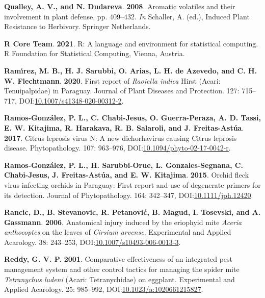 \documentclass[12pt,final,CPage]{ufthesis}
\newlength{\cslhangindent}
\newenvironment{CSLReferences}[2] %
{%
	\setlength{\parindent}{0pt}
	\ifodd #1 \everypar{\setlength{\hangindent}{\cslhangindent}}\ignorespaces\fi
	\ifnum #2 > 0
	\setlength{\parskip}{#2\baselineskip}
	\fi
}%
{}
\begin{document}
{\begin{CSLReferences}{1}{0}
  \leavevmode{}%
  \textbf{Qualley, A. V., and N. Dudareva}. \textbf{2008}. Aromatic volatiles and their involvement in plant defense, pp. 409--432. \emph{In} Schaller, A. (ed.), Induced Plant Resistance to Herbivory. Springer Netherlands.

  \leavevmode{}%
  \textbf{R Core Team}. \textbf{2021}. R: A language and environment for statistical computing. R Foundation for Statistical Computing, Vienna, Austria.

  \leavevmode{}%
  \textbf{Ramı́rez, M. B., H. J. Sarubbi, O. Arias, L. H. de Azevedo, and C. H. W. Flechtmann}. \textbf{2020}. First report of {\emph{Raoiella indica}} {Hirst} ({Acari}: {Tenuipalpidae}) in {Paraguay}. Journal of Plant Diseases and Protection. 127: 715--717, DOI:\href{https://doi.org/10.1007/s41348-020-00312-2}{10.1007/s41348-020-00312-2}.

  \leavevmode{}%
  \textbf{Ramos-González, P. L., C. Chabi-Jesus, O. Guerra-Peraza, A. D. Tassi, E. W. Kitajima, R. Harakava, R. B. Salaroli, and J. Freitas-Astúa}. \textbf{2017}. {Citrus leprosis virus} {N}: A new dichorhavirus causing {Citrus leprosis} disease. Phytopathology{\textregistered}. 107: 963--976, DOI:\href{https://doi.org/10.1094/phyto-02-17-0042-r}{10.1094/phyto-02-17-0042-r}.

  \leavevmode{}%
  \textbf{Ramos-González, P. L., H. Sarubbi-Orue, L. Gonzales-Segnana, C. Chabi-Jesus, J. Freitas-Astúa, and E. W. Kitajima}. \textbf{2015}. {Orchid fleck virus} infecting orchids in {Paraguay}: First report and use of degenerate primers for its detection. Journal of Phytopathology. 164: 342--347, DOI:\href{https://doi.org/10.1111/jph.12420}{10.1111/jph.12420}.

  \leavevmode{}%
  \textbf{Rancic, D., B. Stevanovic, R. Petanović, B. Magud, I. Tosevski, and A. Gassmann}. \textbf{2006}. Anatomical injury induced by the eriophyid mite {\emph{Aceria anthocoptes}} on the leaves of {\emph{Cirsium arvense}}. Experimental and Applied Acarology. 38: 243--253, DOI:\href{https://doi.org/10.1007/s10493-006-0013-3}{10.1007/s10493-006-0013-3}.

  \leavevmode{}%
  \textbf{Reddy, G. V. P.} \textbf{2001}. Comparative effectiveness of an integrated pest management system and other control tactics for managing the spider mite {\emph{Tetranychus ludeni}} {(Acari: Tetranychidae)} on eggplant. Experimental and Applied Acarology. 25: 985--992, DOI:\href{https://doi.org/10.1023/a:1020661215827}{10.1023/a:1020661215827}.


\end{CSLReferences}}
\end{document}
